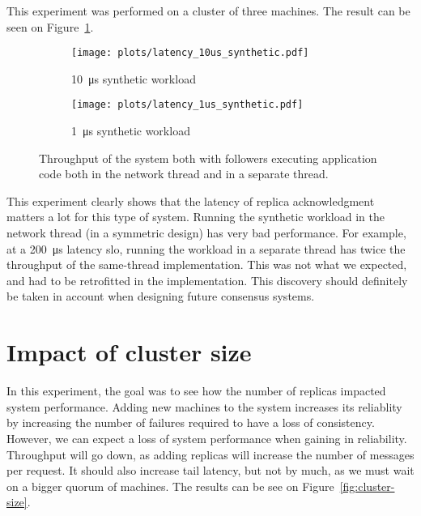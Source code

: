 This experiment was performed on a cluster of three machines.
The result can be seen on Figure~\ref{fig:latency-throughput}.

\begin{figure}[p]
    \centering
    \begin{subfigure}[t]{0.8\textwidth}
        \texttt{[image: plots/latency\_10us\_synthetic.pdf]}
        \caption{\SI{10}{\micro\second} synthetic workload}
    \end{subfigure}

    \begin{subfigure}[t]{0.8\textwidth}
        \texttt{[image: plots/latency\_1us\_synthetic.pdf]}
        \caption{\SI{1}{\micro\second} synthetic workload}
    \end{subfigure}
    \caption{
        Throughput of the system both with followers executing application code both in the network thread and in a separate thread. 
        \label{fig:latency-throughput}
    }
\end{figure}

This experiment clearly shows that the latency of replica acknowledgment matters a lot for this type of system.
Running the synthetic workload in the network thread (in a symmetric design) has very bad performance.
For example, at a \SI{200}{\micro\second} latency \gls{slo}, running the workload in a separate thread has twice the throughput of the same-thread implementation.
This was not what we expected, and had to be retrofitted in the implementation.
This discovery should definitely be taken in account when designing future consensus systems.

\section{Impact of cluster size}


In this experiment, the goal was to see how the number of replicas impacted system performance.
Adding new machines to the system increases its reliablity by increasing the number of failures required to have a loss of consistency.
However, we can expect a loss of system performance when gaining in reliability.
Throughput will go down, as adding replicas will increase the number of messages per request.
It should also increase tail latency, but not by much, as we must wait on a bigger quorum of machines.
The results can be see on Figure~\ref{fig:cluster-size}.

